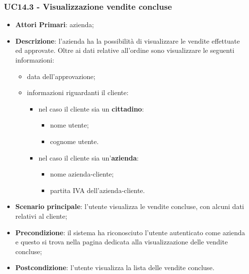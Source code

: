 \subsubsection{UC14.3 - Visualizzazione vendite concluse}
\begin{itemize}
	\item \textbf{Attori Primari}: azienda;
	\item \textbf{Descrizione}: l'azienda ha la possibilità di visualizzare le vendite effettuate ed approvate. Oltre ai dati relative all'ordine sono visualizzare le seguenti informazioni:
		\begin{itemize}
		\item data dell'approvazione;
		\item informazioni riguardanti il cliente:
		\begin{itemize}
			\item nel caso il cliente sia un \textbf{cittadino}:
			\begin{itemize}
				
				\item nome utente;
				\item cognome utente.
			\end{itemize}
			\item nel caso il cliente sia un'\textbf{azienda}:
			\begin{itemize}
				
				\item nome azienda-cliente;
				\item partita IVA dell'azienda-cliente.
			\end{itemize}
		\end{itemize}
		
	\end{itemize}
	\item \textbf{Scenario principale}:  l'utente visualizza le vendite concluse, con alcuni dati relativi al cliente; 
	\item \textbf{Precondizione}: il sistema ha riconosciuto l'utente autenticato come azienda e questo si trova nella pagina dedicata alla visualizzazione delle vendite concluse;
	\item \textbf{Postcondizione}: l'utente visualizza la lista delle vendite concluse.
\end{itemize}


